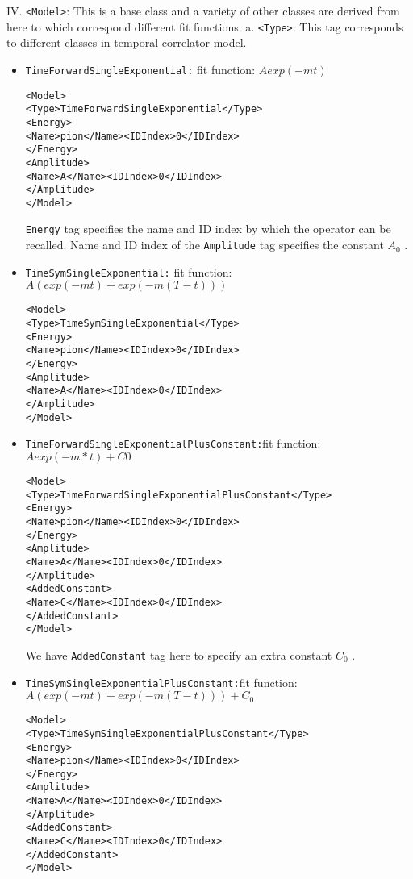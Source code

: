 \documentclass[12pt]{article}
\newcommand{\vb}{\texttt}
\begin{document}
IV. \vb{<Model>}: This is a base class and a variety of other classes are derived from here to which correspond different fit functions.
a. \vb{<Type>}: This tag corresponds to different classes in temporal correlator model.

\begin{itemize}
\item \vb{TimeForwardSingleExponential:} fit function: $A exp(-mt)$
\begin{verbatim}
<Model>
<Type>TimeForwardSingleExponential</Type>
<Energy>
<Name>pion</Name><IDIndex>0</IDIndex>
</Energy>
<Amplitude>
<Name>A</Name><IDIndex>0</IDIndex>
</Amplitude>
</Model>
 \end{verbatim}
 
\vb{Energy} tag specifies the name and ID index by which the operator can be recalled.
Name and ID index of the \vb{Amplitude} tag specifies the constant $A_0$ .

\item \vb{TimeSymSingleExponential:} fit function: $A(exp(-mt) + exp(-m(T-t)))$

\begin{verbatim}
<Model>
<Type>TimeSymSingleExponential</Type>
<Energy>
<Name>pion</Name><IDIndex>0</IDIndex>
</Energy>
<Amplitude>
<Name>A</Name><IDIndex>0</IDIndex>
</Amplitude>
</Model>
\end{verbatim}

\item \vb{TimeForwardSingleExponentialPlusConstant:}fit function:$Aexp(-m*t)+C0$
\begin{verbatim}
<Model>
<Type>TimeForwardSingleExponentialPlusConstant</Type>
<Energy>
<Name>pion</Name><IDIndex>0</IDIndex>
</Energy>
<Amplitude>
<Name>A</Name><IDIndex>0</IDIndex>
</Amplitude>
<AddedConstant>
<Name>C</Name><IDIndex>0</IDIndex>
</AddedConstant>
</Model>
\end{verbatim}

We have \vb{AddedConstant} tag here to specify an extra constant $C_0$ .

\item \vb{TimeSymSingleExponentialPlusConstant:}fit function: $A(exp(-mt) + exp(-m(T-t)) ) + C_0$
\begin{verbatim}
<Model>
<Type>TimeSymSingleExponentialPlusConstant</Type>
<Energy>
<Name>pion</Name><IDIndex>0</IDIndex>
</Energy>
<Amplitude>
<Name>A</Name><IDIndex>0</IDIndex>
</Amplitude>
<AddedConstant>
<Name>C</Name><IDIndex>0</IDIndex>
</AddedConstant>
</Model>
\end{verbatim}


\end{itemize}
\end{document}
